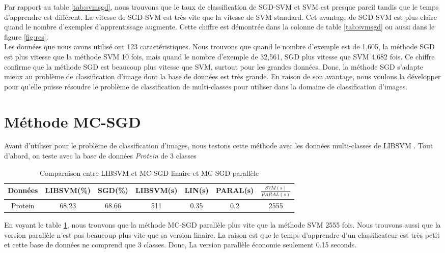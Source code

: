\pagebreak
Par rapport au table \ref{tab:svmsgd}, nous trouvons que le taux de classification de SGD-SVM et SVM est presque pareil tandis que le temps d'apprendre est différent. La vitesse de SGD-SVM est très vite que la vitesse de SVM standard. Cet avantage de SGD-SVM est plus claire quand le nombre d'exemples d'apprentissage augmente. Cette chiffre est démontrée dans la colonne de table \ref{tab:svmsgd} ou aussi dans le figure \ref{fig:res}.\\

Les données que nous avons utilisé ont 123 caractéristiques. Nous trouvons que quand le nombre d'exemple est de 1,605, la méthode SGD est plus vitesse que la méthode SVM 10 fois, mais quand le nombre d'exemple de 32,561, SGD plus vitesse que SVM 4,682 fois. Ce chiffre confirme que la méthode SGD est beaucoup plus vitesse que SVM, surtout pour les grandes données. Donc, la méthode SGD s'adapte mieux au problème de classification d'image dont la base de données est très grande. En raison de son avantage, nous voulons la développer pour qu'elle puisse résoudre le problème de classification de multi-classes pour utiliser dans la domaine de classification d'images.


\section{Méthode MC-SGD}
Avant d'utiliser pour le problème de classification d'images, nous testons cette méthode avec les données multi-classes de LIBSVM \cite{svmdatamul}. Tout d'abord, on teste avec la base de données \textit{Protein} de 3 classes


\begin{table}[h]
\begin{center}
    \begin{tabular}{ | c | c | c | c | c | c | c |}
    \hline
    Données & LIBSVM(\%) & SGD(\%) & LIBSVM(s) & LIN(s) & PARAL(s) & $\frac{SVM(s)}{PARAL(s)}$ \\ \hline
    
    Protein & 68.23 & 68.66 & 511 & 0.35 & 0.2 & 2555 \\ \hline
    
    \end{tabular}
\end{center}
\caption{Comparaison entre LIBSVM et MC-SGD linaire et MC-SGD parallèle}
\label{tab:mcsvm}
\end{table}


En voyant le table \ref{tab:mcsvm}, nous trouvons que la méthode MC-SGD parallèle plus vite que la méthode SVM 2555 fois. Nous trouvons aussi que la version parallèle n'est pas beaucoup plus vite que sa version linaire. La raison est que le temps d'apprendre d'un classificateur est très petit et cette base de données ne comprend que 3 classes. Donc, La version parallèle économie seulement 0.15 seconds.\\

